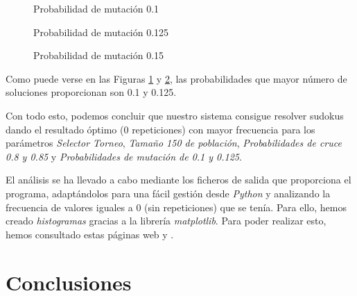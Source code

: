 \documentclass[a4,11pt]{article}
\begin{document}
\begin{itemize}
\begin{figure}[h]
\begin{center}
\end{center}
\caption{Probabilidad de mutación 0.1}
\label{fig:muta01}
\end{figure}

\begin{figure}[h]
\begin{center}
\end{center}
\caption{Probabilidad de mutación 0.125}
\label{fig:muta0125}
\end{figure}

\begin{figure}[h]
\begin{center}
\end{center}
\caption{Probabilidad de mutación 0.15}
\label{fig:muta015}
\end{figure}

Como puede verse en las Figuras \ref{fig:muta01} y \ref{fig:muta0125}, las probabilidades que mayor número de soluciones proporcionan son 0.1 y 0.125.


\end{itemize}

\newpage
\newpage
\newpage
\newpage

Con todo esto, podemos concluir que nuestro sistema consigue resolver sudokus dando el resultado óptimo (0 repeticiones) con mayor frecuencia para los parámetros \emph{Selector Torneo}, \emph{Tamaño 150 de población}, \emph{Probabilidades de cruce 0.8 y 0.85} y \emph{Probabilidades de mutación de 0.1 y 0.125}.


El análisis se ha llevado a cabo mediante los ficheros de salida que proporciona el programa, adaptándolos para una fácil gestión desde \emph{Python} y analizando la frecuencia de valores iguales a 0 (sin repeticiones) que se tenía. Para ello, hemos creado \emph{histogramas} gracias a la librería \emph{matplotlib}. Para poder realizar esto, hemos consultado estas páginas web \cite{hist} y \cite{fich}.

\newpage

\newpage

\newpage

\section{Conclusiones}\label{conc:conc}
\end{document}
